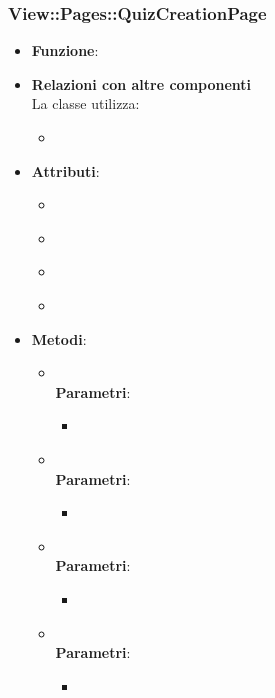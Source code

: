 \subsubsection{View::Pages::QuizCreationPage}
\begin{itemize}
\item\textbf{Funzione}:
\item\textbf{Relazioni con altre componenti}\\
La classe utilizza:
	\begin{itemize}
		\item
	\end{itemize}
\item\textbf{Attributi}:
	\begin{itemize}
		\item\code{}\\
		\item\code{}\\
		\item\code{}\\
		\item\code{}\\
	\end{itemize}
\item\textbf{Metodi}:
	\begin{itemize}
		\item\code{}\\
		\textbf{Parametri}:
			\begin{itemize}
				\item\code{}\\
			\end{itemize}
		\item\code{}\\
		\textbf{Parametri}:
			\begin{itemize}
				\item\code{}\\
			\end{itemize}
		\item\code{}\\
		\textbf{Parametri}:
			\begin{itemize}
				\item\code{}\\
			\end{itemize}
		\item\code{}\\
		\textbf{Parametri}:
			\begin{itemize}
				\item\code{}\\
			\end{itemize}
	\end{itemize}
\end{itemize}


